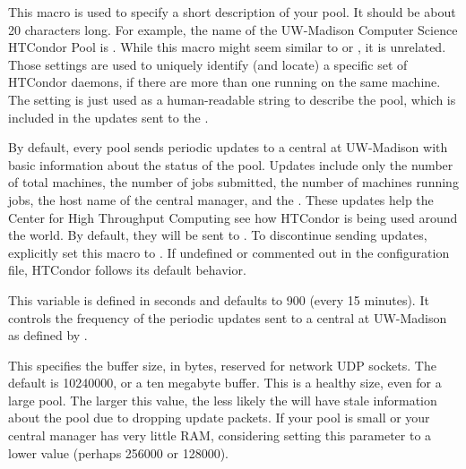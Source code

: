 \begin{description}
\label{param:CollectorName}
\item[\Macro{COLLECTOR\_NAME}]
  This macro is used to specify a short description of your pool.
  It should be about 20 characters long.  For example, the name of the
  UW-Madison Computer Science HTCondor Pool is .  
  While this macro might seem similar to  or
  , it is unrelated.
  Those settings are used to uniquely identify (and locate) a specific
  set of HTCondor daemons, if there are more than one running on the same
  machine.
  The  setting is just used as a
  human-readable string to describe the pool, which is included in the
  updates sent to the .

\label{param:CondorDevelopersCollector}
\item[\Macro{CONDOR\_DEVELOPERS\_COLLECTOR}]
  By default, every pool sends
  periodic updates to a central  at UW-Madison with
  basic information about the status of the pool.  Updates include only
  the number of total machines, the number of jobs submitted, the
  number of machines running jobs, the host name of the central
  manager, and the .  These
  updates help the Center for High Throughput Computing see how HTCondor 
  is being used around the world.
  By default, they will be sent to .
  To discontinue sending updates,
  explicitly set this macro to . 
  If undefined or commented out in the configuration file, HTCondor follows
  its default behavior.

\label{param:CollectorUpdateInterval}
\item[\Macro{COLLECTOR\_UPDATE\_INTERVAL}]
  This variable is defined in seconds and defaults to 900 (every 15 minutes).
  It controls the frequency of the periodic
  updates sent to a central  at UW-Madison as
  defined by .

\label{param:CollectorSocketBufsize}
\item[\Macro{COLLECTOR\_SOCKET\_BUFSIZE}] 
  This specifies the buffer size, in
  bytes, reserved for  network UDP sockets.  The default is
  10240000, or a ten megabyte buffer.  This is a healthy size, even for a large
  pool.  The larger this value, the less likely the  will
  have stale information about the pool due to dropping update packets.  If
  your pool is small or your central manager has very little RAM, considering
  setting this parameter to a lower value (perhaps 256000 or 128000).


\end{description}
